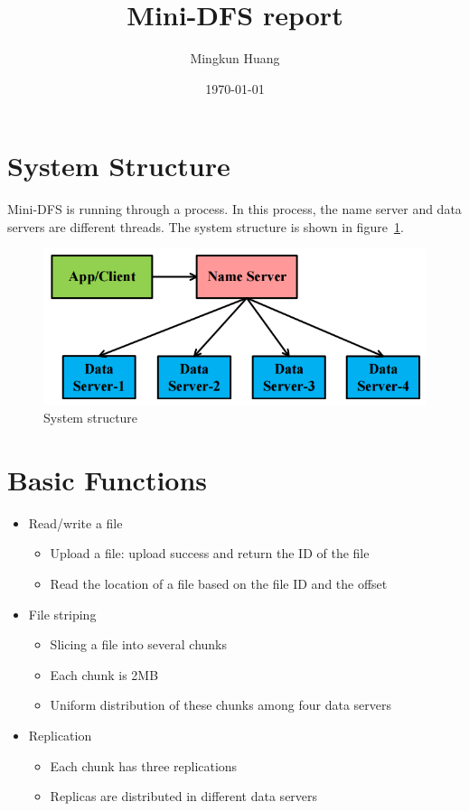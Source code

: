 \documentclass{article}
\title{Mini-DFS report}
\author{Mingkun Huang}
\date{\today}
\begin{document}
\maketitle

\section{System Structure}
Mini-DFS is running through a process. In this process, the name server and data servers are different threads.
The system structure is shown in figure~\ref{fig:dfs}.

\begin{figure}[tbh]
    \centering
    \includegraphics[scale=.5]{project4_pic1}
    \caption{System structure}
    \label{fig:dfs}
\end{figure}

\section{Basic Functions}
\begin{itemize}
    \item Read/write a file
        \begin{itemize}
            \item Upload a file: upload success and return the ID of the file
            \item Read the location of a file based on the file ID and the offset
        \end{itemize}
    \item File striping
        \begin{itemize}
            \item Slicing a file into several chunks
            \item Each chunk is 2MB
            \item Uniform distribution of these chunks among four data servers
        \end{itemize}
    \item Replication
        \begin{itemize}
            \item Each chunk has three replications
            \item Replicas are distributed in different data servers
        \end{itemize}
\end{itemize}
\end{document}
